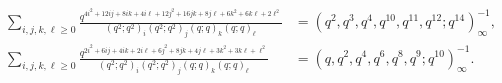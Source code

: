 \begin{align}
\sum_{i,j,k,\ell \ge 0}
\frac{q^{4i^2 + 12 ij + 8ik + 4i\ell + 12j^2 + 16jk + 8j\ell + 6k^2+6k\ell+2\ell^2}}
{\left(q^2;q^2\right)_i\left(q^2;q^2\right)_j\left(q;q\right)_k\left(q;q\right)_\ell}
&= \left(q^2,q^3,q^4,q^{10},q^{11},q^{12};q^{14}\right)^{-1}_\infty \label{eqn:Nandi_intro}, \\ 
\sum_{i,j,k,\ell \ge 0}
\frac{q^{2i^2 + 6 ij + 4ik + 2i\ell + 6j^2 + 8 jk + 4 j\ell + 3k^2+3k\ell+\ell^2}}
{\left(q^2;q^2\right)_i\left(q^2;q^2\right)_j\left(q;q\right)_k\left(q;q\right)_\ell} 
&=\left(q,q^2,q^4,q^6,q^8,q^9;q^{10}\right)^{-1}_\infty\label{eqn:mod10_intro}.
\end{align}
